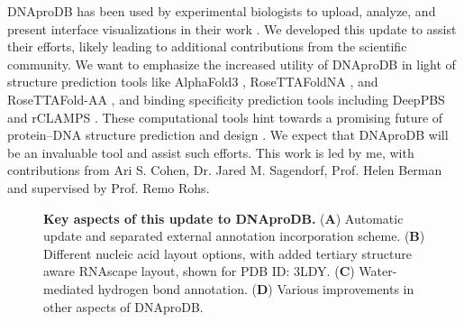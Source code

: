 DNAproDB has been used by experimental biologists to upload, analyze, and present interface visualizations in their work \citep{Webb2024}. We developed this update to assist their efforts, likely leading to additional contributions from the scientific community. We want to emphasize the increased utility of DNAproDB in light of structure prediction tools like AlphaFold3 \citep{Abramson2024}, RoseTTAFoldNA \citep{baek2024na}, and RoseTTAFold-AA \citep{Krishna2024}, and binding specificity prediction tools including DeepPBS \citep{Mitra2024} and rCLAMPS \citep{Wetzel2022}. These computational tools hint towards a promising future of protein–DNA structure prediction and design \citep{Glasscock2023}. We expect that DNAproDB will be an invaluable tool and assist such efforts. This work is led by me, with contributions from Ari S. Cohen, Dr. Jared M. Sagendorf, Prof. Helen Berman and supervised by Prof. Remo Rohs.

\begin{center}
    \begin{figure}
        \caption[Key aspects of this update to DNAproDB.]{\textbf{Key aspects of this update to DNAproDB.} ({\bf A}) Automatic update and separated external annotation incorporation scheme.  ({\bf B})  Different nucleic acid layout options, with added tertiary structure aware RNAscape layout, shown for PDB ID: 3LDY. ({\bf C}) Water-mediated hydrogen bond annotation. ({\bf D}) Various improvements in other aspects of DNAproDB. }
  \label{fig:dnaprodb1}
\end{figure}
\end{center}


